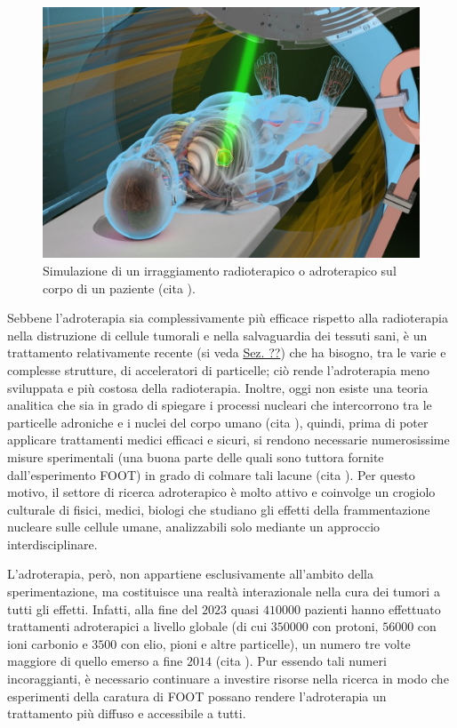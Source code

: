 \documentclass[12pt,a4paper,twoside]{report}
\begin{document}
	\begin{figure}[H]
		\centering
		\includegraphics[width=0.9\linewidth]{images/simulation.jpg}
		\caption{Simulazione di un irraggiamento radioterapico o adroterapico sul corpo di un paziente (cita
			).}
		\label{fig:simulation}
	\end{figure}
	
	Sebbene l'adroterapia sia complessivamente più efficace rispetto alla radioterapia nella distruzione di cellule tumorali e nella salvaguardia dei tessuti sani, è un trattamento relativamente recente (si veda \hyperref[storia_adroterapia]{Sez. ??}) che ha bisogno, tra le varie e complesse strutture, di acceleratori di particelle; ciò rende l'adroterapia meno sviluppata e più costosa della radioterapia. Inoltre, oggi non esiste una teoria analitica che sia in grado di spiegare i processi nucleari che intercorrono tra le particelle adroniche e i nuclei del corpo umano (cita
	), quindi, prima di poter applicare trattamenti medici efficaci e sicuri, si rendono necessarie numerosissime misure sperimentali (una buona parte delle quali sono tuttora fornite dall'esperimento FOOT) in grado di colmare tali lacune (cita
	). Per questo motivo, il settore di ricerca adroterapico è molto attivo e coinvolge un crogiolo culturale di fisici, medici, biologi che studiano gli effetti della frammentazione nucleare sulle cellule umane, analizzabili solo mediante un approccio interdisciplinare.
	
	L'adroterapia, però, non appartiene esclusivamente all'ambito della sperimentazione, ma costituisce una realtà interazionale nella cura dei tumori a tutti gli effetti. Infatti, alla fine del $2023$ quasi $410000$ pazienti hanno effettuato trattamenti adroterapici a livello globale (di cui $350000$ con protoni, $56000$ con ioni carbonio e $3500$ con elio, pioni e altre particelle), un numero tre volte maggiore di quello emerso a fine $2014$ (cita
	). Pur essendo tali numeri incoraggianti, è necessario continuare a investire risorse nella ricerca in modo che esperimenti della caratura di FOOT possano rendere l'adroterapia un trattamento più diffuso e accessibile a tutti.
	
\end{document}
